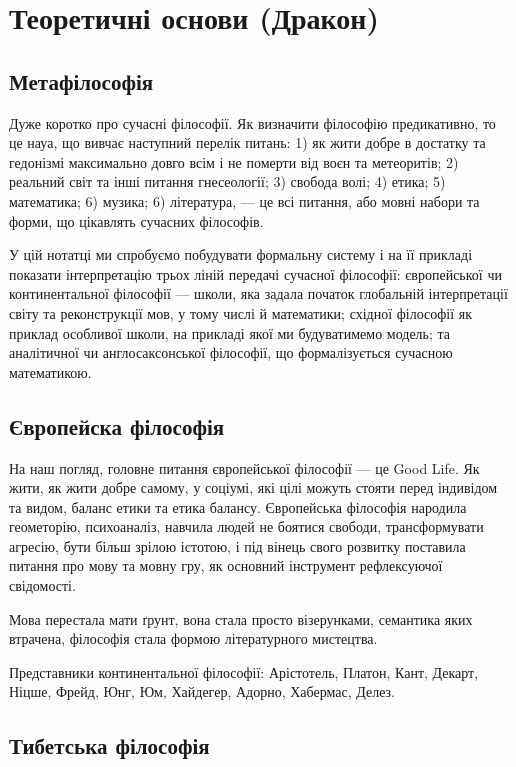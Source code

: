 \section{Теоретичні основи (Дракон)}

\subsection{Метафілософія}

Дуже коротко про сучасні філософії. Як визначити філософію предикативно,
то це науа, що вивчає наступний перелік питань:
1) як жити добре в достатку та гедонізмі максимально довго всім і не померти від воєн та метеоритів;
2) реальний світ та інші питання гнесеології;
3) свобода волі;
4) етика;
5) математика;
6) музика;
6) література,
--- це всі питання, або мовні набори та форми, що цікавлять сучасних філософів.

У цій нотатці ми спробуємо побудувати формальну систему
і на її прикладі показати інтерпретацію трьох ліній
передачі сучасної філософії: європейської чи континентальної
філософії --- школи, яка задала початок глобальній
інтерпретації світу та реконструкції мов, у тому числі
й математики; східної філософії як приклад особливої школи,
на прикладі якої ми будуватимемо модель; та аналітичної чи
англосаксонської філософії, що формалізується сучасною математикою.

\subsection{Європейска філософія}

На наш погляд, головне питання європейської філософії --- це Good Life.
Як жити, як жити добре самому, у соціумі, які цілі можуть стояти перед
індивідом та видом, баланс етики та етика балансу. Європейська
філософія народила геометорію, психоаналіз, навчила людей не
боятися свободи, трансформувати агресію, бути більш зрілою
істотою, і під вінець свого розвитку поставила питання про
мову та мовну гру, як основний інструмент рефлексуючої свідомості.

Мова перестала мати ґрунт, вона стала просто візерунками, семантика
яких втрачена, філософія стала формою літературного мистецтва.

Представники континентальної філософії: Арістотель, Платон, Кант,
Декарт, Ніцше, Фрейд, Юнг, Юм, Хайдегер, Адорно, Хабермас, Делез.

\subsection{Тибетська філософія}

